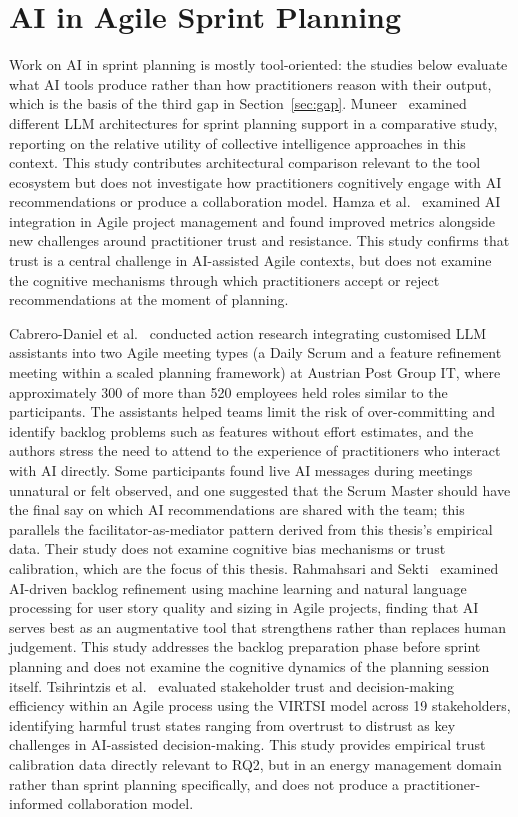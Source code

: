 \documentclass[a4paper,twoside]{bth}
\begin{document}
\section{AI in Agile Sprint Planning}

Work on AI in sprint planning is mostly tool-oriented: the studies below evaluate what AI tools produce rather than how practitioners reason with their output, which is the basis of the third gap in Section~\ref{sec:gap}. Muneer~\cite{muneer2025leveraging} examined different LLM architectures for sprint planning support in a comparative study, reporting on the relative utility of collective intelligence approaches in this context. This study contributes architectural comparison relevant to the tool ecosystem but does not investigate how practitioners cognitively engage with AI recommendations or produce a collaboration model. Hamza et al.~\cite{hamza2025agile} examined AI integration in Agile project management and found improved metrics alongside new challenges around practitioner trust and resistance. This study confirms that trust is a central challenge in AI-assisted Agile contexts, but does not examine the cognitive mechanisms through which practitioners accept or reject recommendations at the moment of planning.

Cabrero-Daniel et al.~\cite{cabrero2024exploring} conducted action research integrating customised LLM assistants into two Agile meeting types (a Daily Scrum and a feature refinement meeting within a scaled planning framework) at Austrian Post Group IT, where approximately 300 of more than 520 employees held roles similar to the participants. The assistants helped teams limit the risk of over-committing and identify backlog problems such as features without effort estimates, and the authors stress the need to attend to the experience of practitioners who interact with AI directly. Some participants found live AI messages during meetings unnatural or felt observed, and one suggested that the Scrum Master should have the final say on which AI recommendations are shared with the team; this parallels the facilitator-as-mediator pattern derived from this thesis's empirical data. Their study does not examine cognitive bias mechanisms or trust calibration, which are the focus of this thesis. Rahmahsari and Sekti~\cite{rahmahsari2026ai} examined AI-driven backlog refinement using machine learning and natural language processing for user story quality and sizing in Agile projects, finding that AI serves best as an augmentative tool that strengthens rather than replaces human judgement. This study addresses the backlog preparation phase before sprint planning and does not examine the cognitive dynamics of the planning session itself. Tsihrintzis et al.~\cite{tsihrintzis2025virtsi} evaluated stakeholder trust and decision-making efficiency within an Agile process using the VIRTSI model across 19 stakeholders, identifying harmful trust states ranging from overtrust to distrust as key challenges in AI-assisted decision-making. This study provides empirical trust calibration data directly relevant to RQ2, but in an energy management domain rather than sprint planning specifically, and does not produce a practitioner-informed collaboration model.
\end{document}
